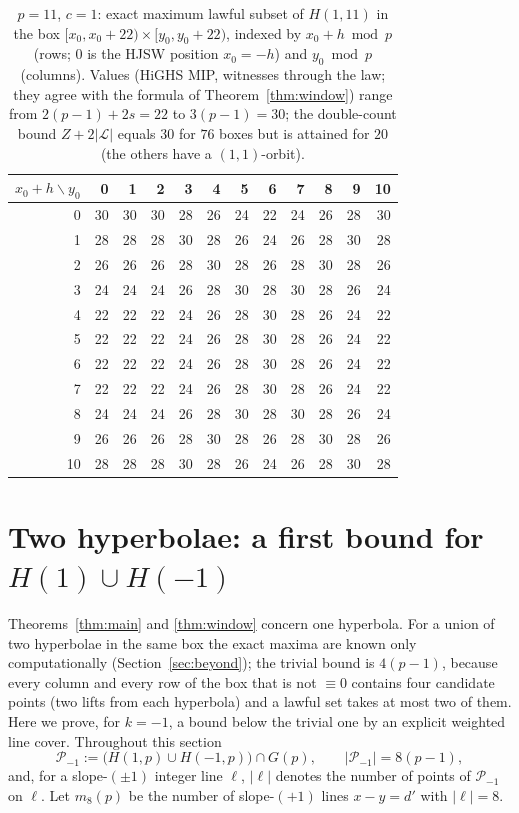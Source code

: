 \documentclass[11pt]{article}
\theoremstyle{remark}
\newcommand{\Gp}{G(p)}
\newcommand{\Lc}{\mathcal{L}}
\newcommand{\Pset}{\mathcal{P}}
\begin{document}
\begin{table}[ht]\centering\footnotesize
\begin{tabular}{r|rrrrrrrrrrr}
\toprule
$x_0+h\backslash y_0$ & 0 & 1 & 2 & 3 & 4 & 5 & 6 & 7 & 8 & 9 & 10\\
\midrule
0 & 30&30&30&28&26&24&22&24&26&28&30\\
1 & 28&28&28&30&28&26&24&26&28&30&28\\
2 & 26&26&26&28&30&28&26&28&30&28&26\\
3 & 24&24&24&26&28&30&28&30&28&26&24\\
4 & 22&22&22&24&26&28&30&28&26&24&22\\
5 & 22&22&22&24&26&28&30&28&26&24&22\\
6 & 22&22&22&24&26&28&30&28&26&24&22\\
7 & 22&22&22&24&26&28&30&28&26&24&22\\
8 & 24&24&24&26&28&30&28&30&28&26&24\\
9 & 26&26&26&28&30&28&26&28&30&28&26\\
10 & 28&28&28&30&28&26&24&26&28&30&28\\
\bottomrule
\end{tabular}
\caption{$p=11$, $c=1$: exact maximum lawful subset of $H(1,11)$ in the box $[x_0,x_0+22)\times[y_0,y_0+22)$, indexed by
$x_0+h\bmod p$ (rows; $0$ is the HJSW position $x_0=-h$) and $y_0\bmod p$ (columns).  Values (HiGHS MIP, witnesses through the law; they agree
with the formula of Theorem~\ref{thm:window}) range from $2(p-1)+2s=22$ to $3(p-1)=30$; the double-count bound $Z+2|\Lc|$
equals $30$ for $76$ boxes but is attained for $20$ (the others have a $(1,1)$-orbit).}
\label{tab:shifts}
\end{table}



\section{Two hyperbolae: a first bound for \texorpdfstring{$H(1)\cup H(-1)$}{H(1) union H(-1)}}\label{sec:two}

Theorems~\ref{thm:main} and \ref{thm:window} concern one hyperbola.  For a union of two hyperbolae in the same box the exact maxima
are known only computationally (Section~\ref{sec:beyond}); the trivial bound is $4(p-1)$, because every column and every row of the
box that is not $\equiv0$ contains four candidate points (two lifts from each hyperbola) and a lawful set takes at most two of them.
Here we prove, for $k=-1$, a bound below the trivial one by an explicit weighted line cover.  Throughout this section
\[
 \Pset_{-1}:=\bigl(H(1,p)\cup H(-1,p)\bigr)\cap\Gp,\qquad |\Pset_{-1}|=8(p-1),
\]
and, for a slope-$(\pm1)$ integer line $\ell$, $|\ell|$ denotes the number of points of $\Pset_{-1}$ on $\ell$.  Let $m_8(p)$ be the
number of slope-$(+1)$ lines $x-y=d'$ with $|\ell|=8$.
\end{document}
